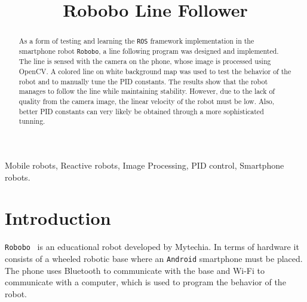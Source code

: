 \documentclass[10pt,conference,compsoc]{IEEEtran}
\begin{document}
\newcommand{\robobo}{\texttt{Robobo}\xspace}
\newcommand{\ros}{\texttt{ROS}\xspace}

\title{Robobo Line Follower}

\author{
}

\maketitle

\begin{abstract}
As a form of testing and learning the \ros framework implementation in the smartphone robot \robobo, a line following program was designed and implemented. The line is sensed with the camera on the phone, whose image is processed using OpenCV. A colored line on white background map was used to test the behavior of the robot and to manually tune the PID constants. The results show that the robot manages to follow the line while maintaining stability. However, due to the lack of quality from the camera image, the linear velocity of the robot must be low. Also, better PID constants can very likely be obtained through a more sophisticated tunning.
\end{abstract}

\begin{IEEEkeywords}
Mobile robots, Reactive robots, Image Processing, PID control, Smartphone robots.
\end{IEEEkeywords}

\section{Introduction}

\robobo~\cite{Robobo} is an educational robot developed by Mytechia. In terms of hardware it consists of a wheeled robotic base where an \texttt{Android} smartphone must be placed. The phone uses Bluetooth to communicate with the base and Wi-Fi to communicate with a computer, which is used to program the behavior of the robot.
\end{document}
